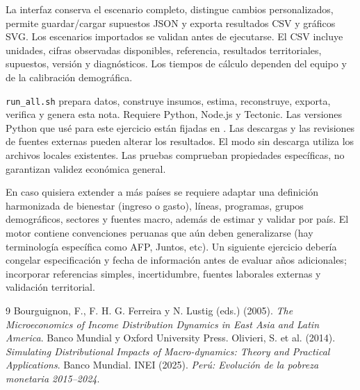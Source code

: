 \documentclass[11pt,a4paper]{article}
\begin{document}
La interfaz conserva el escenario completo, distingue cambios personalizados, permite guardar/cargar supuestos JSON y exporta resultados CSV y gráficos SVG. Los escenarios importados se validan antes de ejecutarse. El CSV incluye unidades, cifras observadas disponibles, referencia, resultados territoriales, supuestos, versión y diagnósticos. Los tiempos de cálculo dependen del equipo y de la calibración demográfica.

\texttt{run\_all.sh} prepara datos, construye insumos, estima, reconstruye, exporta, verifica y genera esta nota. Requiere Python, Node.js y Tectonic. Las versiones Python que usé para este ejercicio están fijadas en . Las descargas y las revisiones de fuentes externas pueden alterar los resultados. El modo sin descarga utiliza los archivos locales existentes. Las pruebas comprueban propiedades específicas, no garantizan validez económica general.

En caso quisiera extender a más países se requiere adaptar una definición harmonizada de bienestar (ingreso o gasto), líneas, programas, grupos demográficos, sectores y fuentes macro, además de estimar y validar por país. El motor contiene convenciones peruanas que aún deben generalizarse (hay terminología específica como AFP, Juntos, etc). Un siguiente ejercicio debería congelar especificación y fecha de información antes de evaluar años adicionales; incorporar referencias simples, incertidumbre, fuentes laborales externas y validación territorial.

\begin{thebibliography}{9}\small
{} Bourguignon, F., F. H. G. Ferreira y N. Lustig (eds.) (2005). \emph{The Microeconomics of Income Distribution Dynamics in East Asia and Latin America}. Banco Mundial y Oxford University Press.
 Olivieri, S. et al. (2014). \emph{Simulating Distributional Impacts of Macro-dynamics: Theory and Practical Applications}. Banco Mundial.
 INEI (2025). \emph{Perú: Evolución de la pobreza monetaria 2015--2024}.
\end{thebibliography}
\end{document}
